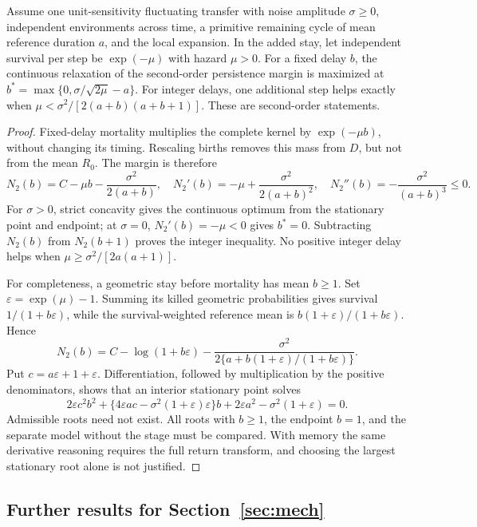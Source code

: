 \begin{lemma}\label{lem:mech-mortality}
Assume one unit-sensitivity fluctuating transfer with noise amplitude $\sigma\geq0$, independent environments across time, a primitive remaining cycle of mean reference duration $a$, and the local expansion. In the added stay, let independent survival per step be $\exp(-\mu)$ with hazard $\mu>0$. For a fixed delay $b$, the continuous relaxation of the second-order persistence margin is maximized at $b^*=\max\{0,\sigma/\sqrt{2\mu}-a\}$. For integer delays, one additional step helps exactly when $\mu<\sigma^2/[2(a+b)(a+b+1)]$. These are second-order statements.
\end{lemma}
\begin{proof}
Fixed-delay mortality multiplies the complete kernel by \(\exp(-\mu b)\), without changing its timing. Rescaling births removes this mass from \(D\), but not from the mean \(R_0\). The margin is therefore
\[
 N_2(b)=C-\mu b-\frac{\sigma^2}{2(a+b)},\quad
 N_2'(b)=-\mu+\frac{\sigma^2}{2(a+b)^2},\quad
 N_2''(b)=-\frac{\sigma^2}{(a+b)^3}\leq0.
\]
For \(\sigma>0\), strict concavity gives the continuous optimum from the stationary point and endpoint; at \(\sigma=0\), \(N_2'(b)=-\mu<0\) gives \(b^*=0\). Subtracting \(N_2(b)\) from \(N_2(b+1)\) proves the integer inequality. No positive integer delay helps when \(\mu\geq\sigma^2/[2a(a+1)]\).

For completeness, a geometric stay before mortality has mean \(b\geq1\). Set \(\varepsilon=\exp(\mu)-1\). Summing its killed geometric probabilities gives survival \(1/(1+b\varepsilon)\), while the survival-weighted reference mean is \(b(1+\varepsilon)/(1+b\varepsilon)\). Hence
\[
 N_2(b)=C-\log(1+b\varepsilon)
 -\frac{\sigma^2}{2\{a+b(1+\varepsilon)/(1+b\varepsilon)\}}.
\]
Put \(c=a\varepsilon+1+\varepsilon\). Differentiation, followed by multiplication by the positive denominators, shows that an interior stationary point solves
\[
 2\varepsilon c^2b^2+\{4\varepsilon ac-\sigma^2(1+\varepsilon)\varepsilon\}b
 +2\varepsilon a^2-\sigma^2(1+\varepsilon)=0.
\]
Admissible roots need not exist. All roots with \(b\geq1\), the endpoint \(b=1\), and the separate model without the stage must be compared. With memory the same derivative reasoning requires the full return transform, and choosing the largest stationary root alone is not justified.
\end{proof}

\subsection{Further results for Section~\ref{sec:mech}}

